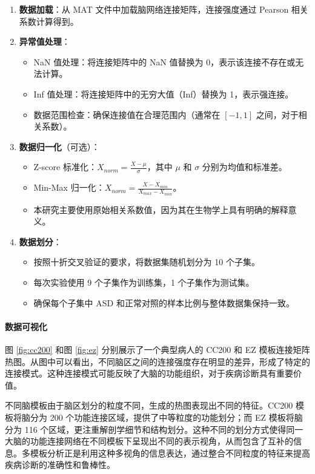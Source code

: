 \documentclass[12pt,a4paper]{article}
\begin{document}
\begin{enumerate}
\item \textbf{数据加载}：从 MAT 文件中加载脑网络连接矩阵，连接强度通过 Pearson 相关系数计算得到。

\item \textbf{异常值处理}：
\begin{itemize}
\item NaN 值处理：将连接矩阵中的 NaN 值替换为 0，表示该连接不存在或无法计算。
\item Inf 值处理：将连接矩阵中的无穷大值（Inf）替换为 1，表示强连接。
\item 数据范围检查：确保连接值在合理范围内（通常在 $[-1, 1]$ 之间，对于相关系数）。
\end{itemize}

\item \textbf{数据归一化}（可选）：
\begin{itemize}
\item Z-score 标准化：$X_{norm} = \frac{X - \mu}{\sigma}$，其中 $\mu$ 和 $\sigma$ 分别为均值和标准差。
\item Min-Max 归一化：$X_{norm} = \frac{X - X_{min}}{X_{max} - X_{min}}$。
\item 本研究主要使用原始相关系数值，因为其在生物学上具有明确的解释意义。
\end{itemize}

\item \textbf{数据划分}：
\begin{itemize}
\item 按照十折交叉验证的要求，将数据集随机划分为 10 个子集。
\item 每次实验使用 9 个子集作为训练集，1 个子集作为测试集。
\item 确保每个子集中 ASD 和正常对照的样本比例与整体数据集保持一致。
\end{itemize}
\end{enumerate}

\paragraph{数据可视化}
图 \ref{fig:cc200} 和图 \ref{fig:ez} 分别展示了一个典型病人的 CC200 和 EZ 模板连接矩阵热图。从图中可以看出，不同脑区之间的连接强度存在明显的差异，形成了特定的连接模式。这种连接模式可能反映了大脑的功能组织，对于疾病诊断具有重要价值。

不同脑模板由于脑区划分的粒度不同，生成的热图表现出不同的特征。CC200 模板将脑分为 200 个功能连接区域，提供了中等粒度的功能划分；而 EZ 模板将脑分为 116 个区域，更注重解剖学细节和结构划分。这种不同的划分方式使得同一大脑的功能连接网络在不同模板下呈现出不同的表示视角，从而包含了互补的信息。多模板分析正是利用这种多视角的信息表达，通过整合不同粒度的特征来提高疾病诊断的准确性和鲁棒性。
\end{document}
